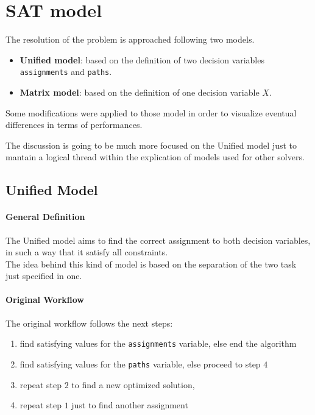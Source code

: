 \section{SAT model}

The resolution of the problem is approached following two models.

\begin{itemize}
    \item \textbf{Unified model}:
    based on the definition of two decision variables \texttt{assignments} and \texttt{paths}.
    \item \textbf{Matrix model}:
    based on the definition of one decision variable $X$.
\end{itemize}

Some modifications were applied to those model in order to visualize eventual differences in terms of performances.

The discussion is going to be much more focused on the Unified model just to mantain a logical thread within the explication of models used for other solvers.

\subsection{Unified Model}

\paragraph*{General Definition}
The Unified model aims to find the correct assignment to both decision variables, in such a way that it satisfy all constraints.\\
The idea behind this kind of model is based on the separation of the two task just specified in one.

\paragraph*{Original Workflow}
The original workflow follows the next steps:
\begin{enumerate}
    \item find satisfying values for the \texttt{assignments} variable, else end the algorithm
    \item find satisfying values for the \texttt{paths} variable, else proceed to step $4$
    \item repeat step $2$ to find a new optimized solution,
    \item repeat step $1$ just to find another assignment
\end{enumerate}

